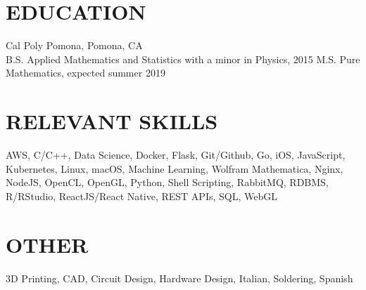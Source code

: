 \documentclass[margin]{./res}
\begin{document}
\begin{resume}
\section{EDUCATION}
Cal Poly Pomona, Pomona, CA \\
B.S. Applied Mathematics and Statistics with a minor in Physics, 2015 \newline
M.S. Pure Mathematics, expected summer 2019

\section{RELEVANT SKILLS}
AWS, C/C++, Data Science, Docker, Flask, 
Git/Github, Go, iOS, JavaScript, Kubernetes, Linux, macOS, Machine Learning, Wolfram Mathematica, 
Nginx, NodeJS, OpenCL, OpenGL, Python, Shell Scripting, RabbitMQ, RDBMS, R/RStudio,
ReactJS/React Native, REST APIs, SQL, WebGL
\section{OTHER}
3D Printing, CAD, Circuit Design,
Hardware Design, Italian, Soldering, Spanish
 
\end{resume}
\end{document}
